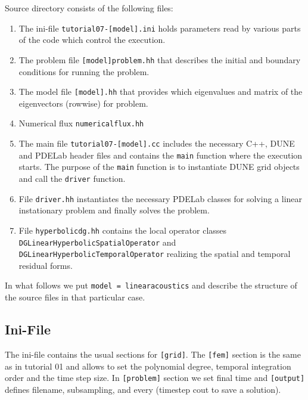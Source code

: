 \documentclass[a4paper,12pt]{article}
\theoremstyle{definition}
\theoremstyle{definition}
\begin{document}
Source directory consists of the following files:
\begin{enumerate}[1)]
	\item The ini-file
	\lstinline{tutorial07-[model].ini} holds parameters read by various parts of the code
	which control the execution.
	\item The problem file \lstinline{[model]problem.hh} that describes the initial and boundary conditions for running the problem.
	\item The model file \lstinline{[model].hh} that provides  which eigenvalues and matrix  of the eigenvectors (rowwise) for problem.
	\item Numerical flux \lstinline{numericalflux.hh}
	\item The main file \lstinline{tutorial07-[model].cc} includes the necessary C++,
	DUNE and PDELab header files
	and contains the \lstinline{main} function where the execution starts.
	The purpose of the \lstinline{main} function is
	to instantiate DUNE grid objects and call the \lstinline{driver} function.
	\item File \lstinline{driver.hh} instantiates the necessary PDELab classes
	for solving a linear instationary problem and finally solves the problem.
	\item File \lstinline{hyperbolicdg.hh} contains the local operator classes \\
	\lstinline{DGLinearHyperbolicSpatialOperator} and \\
	\lstinline{DGLinearHyperbolicTemporalOperator} realizing the spatial
	and temporal residual forms.
	
\end{enumerate}


In what follows we put  \lstinline{model = linearacoustics} and describe the structure of the source files in that particular case.

\subsection{Ini-File}

The ini-file contains the usual sections for \lstinline{[grid]}. The
\lstinline{[fem]} section is the same as in tutorial 01 and allows to set
the polynomial degree, temporal integration order and the time step size. In \lstinline{[problem]} section we set final time and \lstinline{[output]} defines filename,
subsampling, and every (timestep cout to save a solution).     
\end{document}
